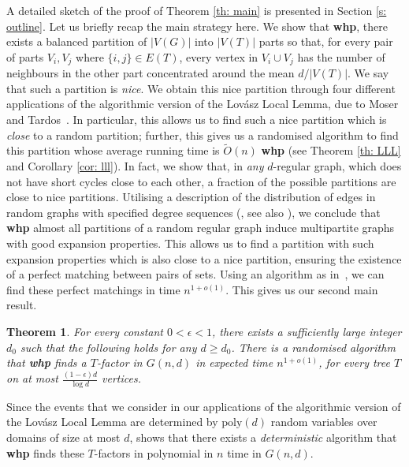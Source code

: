 \documentclass[notitlepage]{scrartcl}
\newtheorem{theorem}{Theorem}
\begin{document}
A detailed sketch of the proof of Theorem \ref{th: main} is presented in Section \ref{s: outline}. Let us briefly recap the main strategy here. We show that \textbf{whp}, there exists a balanced partition of $|V(G)|$ into $|V(T)|$ parts so that, for every pair of parts $V_i,V_j$ where $\{i,j\}\in E(T)$, every vertex in $V_i\cup V_j$ has the number of neighbours in the other part concentrated around the mean $d/|V(T)|$. We say that such a partition is \textit{nice}. We obtain this nice partition through four different applications of the algorithmic version of the Lov\'asz Local Lemma, due to Moser and Tardos~\cite{MT10}. In particular, this allows us to find such a nice partition which is \textit{close} to a random partition; further, this gives us a randomised algorithm to find this partition whose average running time is $\tilde{O}(n)$ \textbf{whp} (see Theorem \ref{th: LLL} and Corollary \ref{cor: lll}). In fact, we show that, in \emph{any} $d$-regular graph, which does not have short cycles close to each other, a fraction of the possible partitions are close to nice partitions. Utilising a description of the distribution of edges in random graphs with specified degree sequences (\cite{gao2023subgraph}, see also \cite[Theorem 2.2]{McKaySurvey}), we conclude that \textbf{whp} almost all partitions of a random regular graph induce multipartite graphs with good expansion properties. This allows us to find a partition with such expansion properties which is also close to a nice partition, ensuring the existence of a perfect matching between pairs of sets. Using an algorithm as in~\cite{chen2022maximum}, we can find these perfect matchings in time $n^{1+o(1)}$. This gives us our second main result.
\begin{theorem}\label{cor: running time}
For every constant $0< \epsilon<1$, there exists a sufficiently large integer $d_0$ such that the following holds for any $d\ge d_0$. There is a randomised algorithm that \textbf{whp} finds a $T$-factor in $G(n,d)$ in expected time $n^{1+o(1)}$, for every tree $T$ on at most $\frac{(1-\epsilon) d}{\log d}$ vertices.
\end{theorem}
Since the events that we consider in our applications of the algorithmic version of the Lov\'asz Local Lemma are determined by $\text{poly}(d)$ random variables over domains of size at most $d$, \cite[Theorem 1.4]{MT10} shows that there exists a \textit{deterministic} algorithm that \textbf{whp} finds these $T$-factors in polynomial in $n$ time in $G(n,d)$. 
\end{document}
